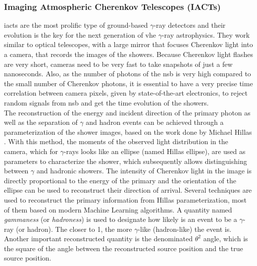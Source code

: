 \documentclass[main.tex]{subfiles}
\begin{document}
\subsubsection{Imaging Atmospheric Cherenkov Telescopes (IACTs)} \label{sec:IACTs}

\glspl{iact} are the most prolific type of ground-based $\gamma$-ray detectors and their evolution is the key for the next generation of \gls{vhe} $\gamma$-ray astrophysics.
They work similar to optical telescopes, with a large mirror that focuses Cherenkov light into a camera, that records the images of the showers.
Because Cherenkov light flashes are very short, cameras need to be very fast to take snapshots of just a few nanoseconds. Also, as the number of photons of the \gls{nsb} is very high compared to the small number of Cherenkov photons, it is essential to have a very precise time correlation between camera pixels, given by state-of-the-art electronics, to reject random signals from \gls{nsb} and get the time evolution of the showers.\\
The reconstruction of the energy and incident direction of the primary photon as well as the separation of $\gamma$ and hadron events can be achieved through a parameterization of the shower images, based on the work done by Michael Hillas \cite{1985Hillas}. With this method, the moments of the observed light distribution in the camera, which for $\gamma$-rays looks like an ellipse (named Hillas ellipse), are used as parameters to characterize the shower, which subsequently allows distinguishing between $\gamma$  and hadronic showers.
The intensity of Cherenkov light in the image is directly proportional to the energy of the primary and the orientation of the ellipse can be used to reconstruct their direction of arrival. Several techniques are used to reconstruct the primary information from Hillas parameterization, most of them based on modern Machine Learning algorithms. A quantity named \textit{gammaness} (or \textit{hadroness}) is used to designate how likely is an event to be a $\gamma$-ray (or hadron). The closer to 1, the more $\gamma$-like (hadron-like) the event is. Another important reconstructed quantity is the denominated $\theta^2$ angle, which is the square of the angle between the reconstructed source position and the true source position.
\end{document}

